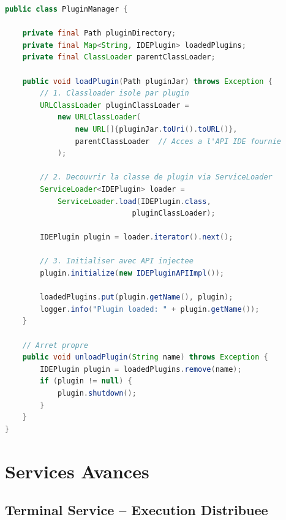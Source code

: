 \documentclass[11pt,a4paper,hidelinks]{book}
\begin{document}
\begin{lstlisting}[language=Java, caption={Plugin Manager -- Chargement}]
public class PluginManager {
    
    private final Path pluginDirectory;
    private final Map<String, IDEPlugin> loadedPlugins;
    private final ClassLoader parentClassLoader;
    
    public void loadPlugin(Path pluginJar) throws Exception {
        // 1. Classloader isole par plugin
        URLClassLoader pluginClassLoader = 
            new URLClassLoader(
                new URL[]{pluginJar.toUri().toURL()},
                parentClassLoader  // Acces a l'API IDE fournie
            );
        
        // 2. Decouvrir la classe de plugin via ServiceLoader
        ServiceLoader<IDEPlugin> loader = 
            ServiceLoader.load(IDEPlugin.class, 
                             pluginClassLoader);
        
        IDEPlugin plugin = loader.iterator().next();
        
        // 3. Initialiser avec API injectee
        plugin.initialize(new IDEPluginAPIImpl());
        
        loadedPlugins.put(plugin.getName(), plugin);
        logger.info("Plugin loaded: " + plugin.getName());
    }
    
    // Arret propre
    public void unloadPlugin(String name) throws Exception {
        IDEPlugin plugin = loadedPlugins.remove(name);
        if (plugin != null) {
            plugin.shutdown();
        }
    }
}
\end{lstlisting}

\section{Services Avances}

\subsection{Terminal Service -- Execution Distribuee}
\end{document}
